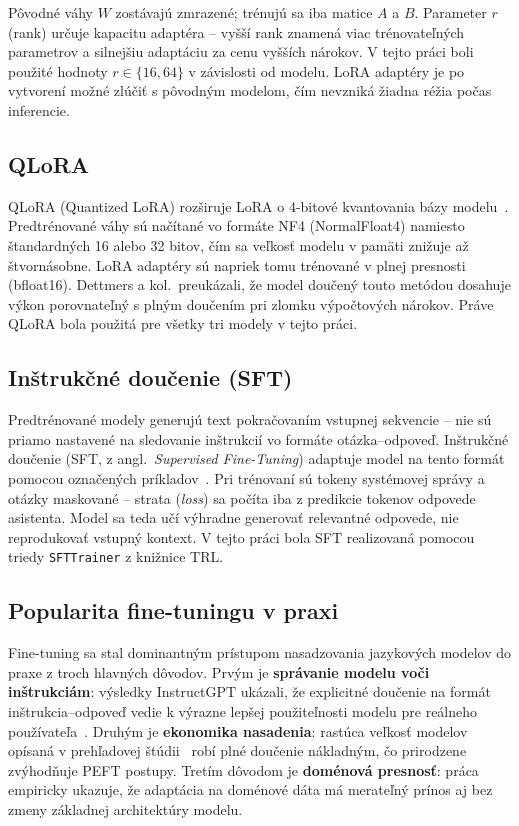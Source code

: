 Pôvodné váhy $W$ zostávajú zmrazené; trénujú sa iba matice $A$ a $B$. Parameter $r$ (rank) určuje kapacitu adaptéra -- vyšší rank znamená viac trénovateľných parametrov a silnejšiu adaptáciu za cenu vyšších nárokov. V tejto práci boli použité hodnoty $r \in \{16, 64\}$ v závislosti od modelu. LoRA adaptéry je po vytvorení možné zlúčiť s pôvodným modelom, čím nevzniká žiadna réžia počas inferencie.

\subsection{QLoRA}

QLoRA (Quantized LoRA) rozširuje LoRA o 4-bitové kvantovania bázy modelu~\cite{Dettmers2023QLoRA}. Predtrénované váhy sú načítané vo formáte NF4 (NormalFloat4) namiesto štandardných 16 alebo 32 bitov, čím sa veľkosť modelu v pamäti znižuje až štvornásobne. LoRA adaptéry sú napriek tomu trénované v plnej presnosti (bfloat16). Dettmers a kol.\ preukázali, že model doučený touto metódou dosahuje výkon porovnateľný s plným doučením pri zlomku výpočtových nárokov. Práve QLoRA bola použitá pre všetky tri modely v tejto práci.

\subsection{Inštrukčné doučenie (SFT)}

Predtrénované modely generujú text pokračovaním vstupnej sekvencie -- nie sú priamo nastavené na sledovanie inštrukcií vo formáte otázka--odpoveď. Inštrukčné doučenie (SFT, z angl.\ \emph{Supervised Fine-Tuning}) adaptuje model na tento formát pomocou označených príkladov~\cite{Ouyang2022InstructGPT}. Pri trénovaní sú tokeny systémovej správy a otázky maskované -- strata (\emph{loss}) sa počíta iba z predikcie tokenov odpovede asistenta. Model sa teda učí výhradne generovať relevantné odpovede, nie reprodukovať vstupný kontext. V tejto práci bola SFT realizovaná pomocou triedy \texttt{SFTTrainer} z knižnice TRL.

\subsection{Popularita fine-tuningu v praxi}

Fine-tuning sa stal dominantným prístupom nasadzovania jazykových modelov do praxe z troch hlavných dôvodov. Prvým je \textbf{správanie modelu voči inštrukciám}: výsledky InstructGPT ukázali, že explicitné doučenie na formát inštrukcia--odpoveď vedie k výrazne lepšej použiteľnosti modelu pre reálneho používateľa~\cite{Ouyang2022InstructGPT}. Druhým je \textbf{ekonomika nasadenia}: rastúca veľkosť modelov opísaná v prehľadovej štúdii~\cite{Zhao2023SurveyLLM} robí plné doučenie nákladným, čo prirodzene zvýhodňuje PEFT postupy. Tretím dôvodom je \textbf{doménová presnosť}: práca~\cite{Gururangan2020DontStop} empiricky ukazuje, že adaptácia na doménové dáta má merateľný prínos aj bez zmeny základnej architektúry modelu.

